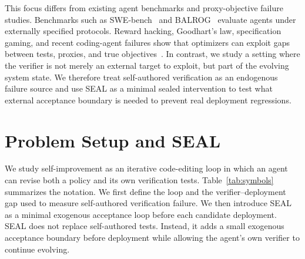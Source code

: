 \documentclass[letterpaper]{article} \usepackage{aaai2027}  \usepackage[hyphens]{url}  \usepackage{graphicx} \urlstyle{rm} \def\UrlFont{\rm}  \usepackage{natbib}  \usepackage{caption} \usepackage{amsfonts} \usepackage{multirow} \frenchspacing  \usepackage{algorithm}
\begin{document}
This focus differs from existing agent benchmarks and proxy-objective failure studies. Benchmarks such as SWE-bench~\citep{jimenez2024swe} and BALROG~\citep{paglieri2025balrog} evaluate agents under externally specified protocols. Reward hacking, Goodhart's law, specification gaming, and recent coding-agent failures show that optimizers can exploit gaps between tests, proxies, and true objectives~\citep{huang2024large,chen2025revisit}. 
In contrast, we study a setting where the verifier is not merely an external target to exploit, but part of the evolving system state. We therefore treat self-authored verification as an endogenous failure source and use SEAL as a minimal sealed intervention to test what external acceptance boundary is needed to prevent real deployment regressions.











\section{Problem Setup and SEAL}\label{sec:method}





We study self-improvement as an iterative code-editing loop in which an agent can revise both a policy and its own verification tests. 
Table~\ref{tab:symbols} summarizes the notation.
We first define the loop and the verifier--deployment gap used to measure self-authored verification failure. We then introduce SEAL as a minimal exogenous acceptance loop before each candidate deployment. SEAL does not replace self-authored tests. Instead, it adds a small exogenous acceptance boundary before deployment while allowing the agent's own verifier to continue evolving.
\end{document}
